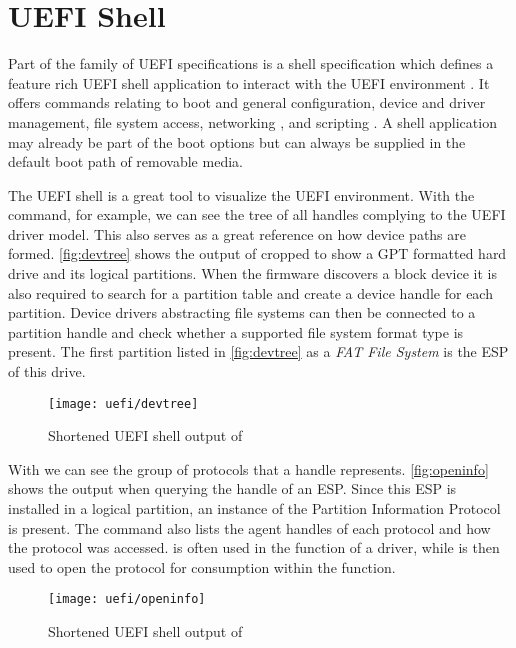 
\section{\acs{UEFI} Shell}

Part of the family of \ac{UEFI} specifications is a shell specification which defines a feature rich \ac{UEFI} shell application to interact with the \ac{UEFI} environment \cite[Section 1.1]{uefi-shell-spec}.
It offers commands relating to boot and general configuration, device and driver management, file system access, networking \cite[Section 5.1]{uefi-shell-spec}, and scripting \cite[Section 4]{uefi-shell-spec}.
A shell application may already be part of the boot options but can always be supplied in the default boot path of removable media.

The \ac{UEFI} shell is a great tool to visualize the \ac{UEFI} environment.
With the  command, for example, we can see the tree of all handles complying to the \ac{UEFI} driver model.
This also serves as a great reference on how device paths are formed.
\autoref{fig:devtree} shows the output of  cropped to show a \ac{GPT} formatted hard drive and its logical partitions.
When the firmware discovers a block device it is also required to search for a partition table and create a device handle for each partition.
Device drivers abstracting file systems can then be connected to a partition handle and check whether a supported file system format type is present.
The first partition listed in \autoref{fig:devtree} as a \emph{FAT File System} is the \ac{ESP} of this drive.

\begin{figure}[htb]
    \centering
    \texttt{[image: uefi/devtree]}
    \caption{Shortened \ac{UEFI} shell output of }
    \label{fig:devtree}
\end{figure}

With  we can see the group of protocols that a handle represents.
\autoref{fig:openinfo} shows the output when querying the handle of an \ac{ESP}.
Since this \ac{ESP} is installed in a logical partition, an instance of the Partition Information Protocol is present.
The command also lists the agent handles of each protocol and how the protocol was accessed.
 is often used in the  function of a driver, while  is then used to open the protocol for consumption within the  function.

\begin{figure}[htb]
    \centering
    \texttt{[image: uefi/openinfo]}
    \caption{Shortened \ac{UEFI} shell output of }
    \label{fig:openinfo}
\end{figure}